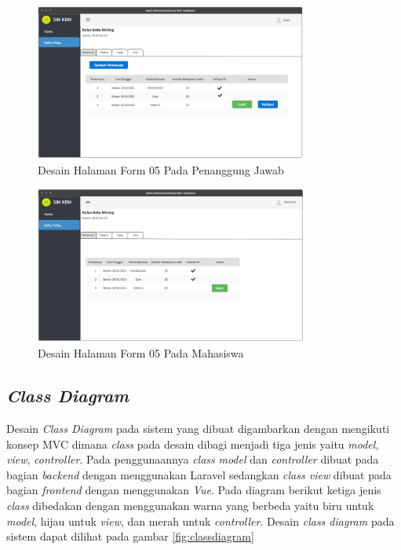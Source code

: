 \begin{figure}[h!]
	\centering
	\includegraphics[width=0.8\textwidth]{gambar/mockup/form05_pj}
	\caption{Desain Halaman Form 05 Pada Penanggung Jawab}
	\label{fig:form05pj}
\end{figure}

\begin{figure}[h!]
	\centering
	\includegraphics[width=0.8\textwidth]{gambar/mockup/form05_mahasiswa}
	\caption{Desain Halaman Form 05 Pada Mahasiswa }
	\label{fig:form05mhs}
\end{figure}


\subsection{\textit{Class Diagram}}
	Desain \textit{Class Diagram} pada sistem yang dibuat digambarkan dengan mengikuti konsep MVC dimana \textit{class} pada desain dibagi menjadi tiga jenis yaitu \textit{model}, \textit{view}, \textit{controller}. Pada penggunaannya \textit{class} \textit{model} dan \textit{controller} dibuat pada bagian \textit{backend} dengan menggunakan Laravel sedangkan \textit{class view} dibuat pada bagian \textit{frontend} dengan menggunakan \textit{Vue}. Pada diagram berikut ketiga jenis \textit{class} dibedakan dengan menggunakan warna yang berbeda yaitu biru untuk \textit{model}, hijau untuk \textit{view}, dan merah untuk \textit{controller}. Desain \textit{class diagram} pada sistem dapat dilihat pada gambar \ref{fig:classdiagram}

